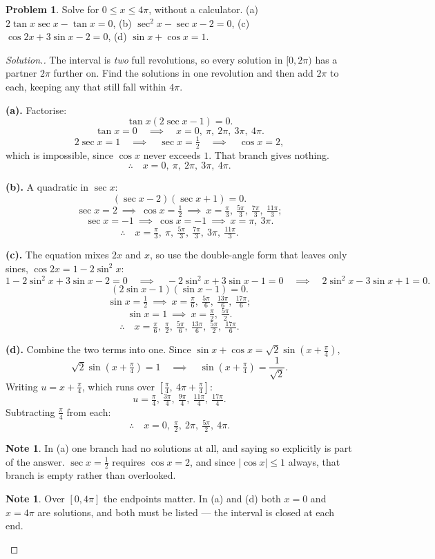 \documentclass[11pt,a4paper]{article}
\theoremstyle{definition}
\newtheorem{note}[thm]{Note}
\newtheorem{problemx}{Problem}[section]
\newenvironment{problem}{\begin{problemx}}{\end{problemx}}
\newenvironment{solution}
  {\renewcommand{\qedsymbol}{}\begin{proof}[\textit{Solution}.]}
  {\end{proof}}
\begin{document}
\begin{problem}
Solve for $0\leq x\leq 4\pi$, without a calculator.
\quad (a) $2\tan x\sec x-\tan x=0$, \quad (b) $\sec^2x-\sec x-2=0$, \quad
(c) $\cos 2x+3\sin x-2=0$, \quad (d) $\sin x+\cos x=1$.
\end{problem}

\begin{solution}
The interval is \emph{two} full revolutions, so every solution in $[0,2\pi)$ has a
partner $2\pi$ further on. Find the solutions in one revolution and then add $2\pi$ to
each, keeping any that still fall within $4\pi$.

\textbf{(a).} Factorise:
$$\tan x\left(2\sec x-1\right)=0.$$
$$\tan x=0\quad\implies\quad x=0,\ \pi,\ 2\pi,\ 3\pi,\ 4\pi.$$
$$2\sec x=1\quad\implies\quad \sec x=\tfrac{1}{2}\quad\implies\quad \cos x=2,$$
which is impossible, since $\cos x$ never exceeds $1$. That branch gives nothing.
$$\therefore\quad x=0,\ \pi,\ 2\pi,\ 3\pi,\ 4\pi.$$

\textbf{(b).} A quadratic in $\sec x$:
$$(\sec x-2)(\sec x+1)=0.$$
$$\sec x=2\ \implies\ \cos x=\tfrac{1}{2}\ \implies\ x=\tfrac{\pi}{3},\
\tfrac{5\pi}{3},\ \tfrac{7\pi}{3},\ \tfrac{11\pi}{3};$$
$$\sec x=-1\ \implies\ \cos x=-1\ \implies\ x=\pi,\ 3\pi.$$
$$\therefore\quad x=\tfrac{\pi}{3},\ \pi,\ \tfrac{5\pi}{3},\ \tfrac{7\pi}{3},\
3\pi,\ \tfrac{11\pi}{3}.$$

\textbf{(c).} The equation mixes $2x$ and $x$, so use the double-angle form that leaves
only sines, $\cos 2x=1-2\sin^2x$:
$$1-2\sin^2x+3\sin x-2=0\quad\implies\quad -2\sin^2x+3\sin x-1=0
\quad\implies\quad 2\sin^2x-3\sin x+1=0.$$
$$(2\sin x-1)(\sin x-1)=0.$$
$$\sin x=\tfrac{1}{2}\ \implies\ x=\tfrac{\pi}{6},\ \tfrac{5\pi}{6},\
\tfrac{13\pi}{6},\ \tfrac{17\pi}{6};$$
$$\sin x=1\ \implies\ x=\tfrac{\pi}{2},\ \tfrac{5\pi}{2}.$$
$$\therefore\quad x=\tfrac{\pi}{6},\ \tfrac{\pi}{2},\ \tfrac{5\pi}{6},\
\tfrac{13\pi}{6},\ \tfrac{5\pi}{2},\ \tfrac{17\pi}{6}.$$

\textbf{(d).} Combine the two terms into one. Since
$\sin x+\cos x=\sqrt{2}\sin\left(x+\frac{\pi}{4}\right)$,
$$\sqrt{2}\sin\left(x+\tfrac{\pi}{4}\right)=1\quad\implies\quad
\sin\left(x+\tfrac{\pi}{4}\right)=\frac{1}{\sqrt{2}}.$$
Writing $u=x+\frac{\pi}{4}$, which runs over
$\left[\frac{\pi}{4},\ 4\pi+\frac{\pi}{4}\right]$:
$$u=\tfrac{\pi}{4},\ \tfrac{3\pi}{4},\ \tfrac{9\pi}{4},\ \tfrac{11\pi}{4},\
\tfrac{17\pi}{4}.$$
Subtracting $\frac{\pi}{4}$ from each:
$$\therefore\quad x=0,\ \tfrac{\pi}{2},\ 2\pi,\ \tfrac{5\pi}{2},\ 4\pi.$$

\begin{note}
In (a) one branch had no solutions at all, and saying so explicitly is part of the
answer. $\sec x=\frac{1}{2}$ requires $\cos x=2$, and since $|\cos x|\leq 1$ always,
that branch is empty rather than overlooked.
\end{note}

\begin{note}
Over $[0,4\pi]$ the endpoints matter. In (a) and (d) both $x=0$ and $x=4\pi$ are
solutions, and both must be listed --- the interval is closed at each end.
\end{note}
\end{solution}
\end{document}
